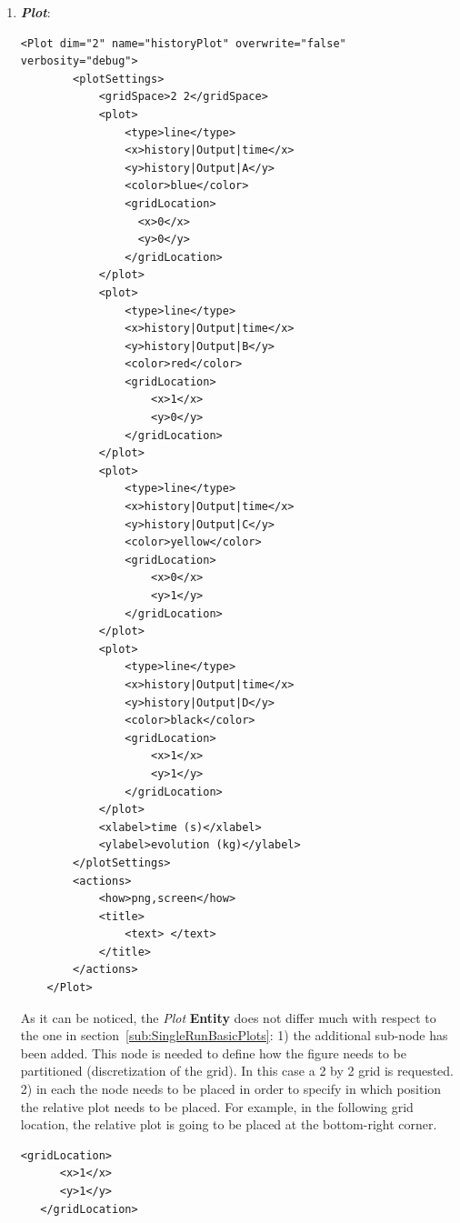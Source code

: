 \begin{enumerate}
   \item \textbf{\textit{Plot}}:
   \begin{lstlisting}[style=XML,morekeywords={arg,extension,pauseAtEnd,overwrite}]
    <Plot dim="2" name="historyPlot" overwrite="false" verbosity="debug">
        <plotSettings>
            <gridSpace>2 2</gridSpace>
            <plot>
                <type>line</type>
                <x>history|Output|time</x>
                <y>history|Output|A</y>
                <color>blue</color>
                <gridLocation>
                  <x>0</x>
                  <y>0</y>
                </gridLocation>
            </plot>
            <plot>
                <type>line</type>
                <x>history|Output|time</x>
                <y>history|Output|B</y>
                <color>red</color>
                <gridLocation>
                    <x>1</x>
                    <y>0</y>
                </gridLocation>
            </plot>
            <plot>
                <type>line</type>
                <x>history|Output|time</x>
                <y>history|Output|C</y>
                <color>yellow</color>
                <gridLocation>
                    <x>0</x>
                    <y>1</y>
                </gridLocation>
            </plot>
            <plot>
                <type>line</type>
                <x>history|Output|time</x>
                <y>history|Output|D</y>
                <color>black</color>
                <gridLocation>
                    <x>1</x>
                    <y>1</y>
                </gridLocation>
            </plot>
            <xlabel>time (s)</xlabel>
            <ylabel>evolution (kg)</ylabel>
        </plotSettings>
        <actions>
            <how>png,screen</how>
            <title>
                <text> </text>
            </title>
        </actions>
    </Plot>
\end{lstlisting}   
 As it can be noticed, the  \textit{Plot} \textbf{Entity} does not differ much with respect to the one in 
 section~\ref{sub:SingleRunBasicPlots}: 1) the additional sub-node   has been added. 
 This node is needed to define how the figure needs to be partitioned (discretization of the grid). In this case
 a 2 by 2 grid is requested. 2) in each  the node  needs to be placed in 
 order to specify in which position the relative plot needs to be placed. For example, in the following grid 
 location, the relative plot is going to be placed at the bottom-right corner.
  \begin{lstlisting}[style=XML,morekeywords={arg,extension,pauseAtEnd,overwrite}]
   <gridLocation>
      <x>1</x>
      <y>1</y>
   </gridLocation>
   \end{lstlisting}   
 \end{enumerate}
